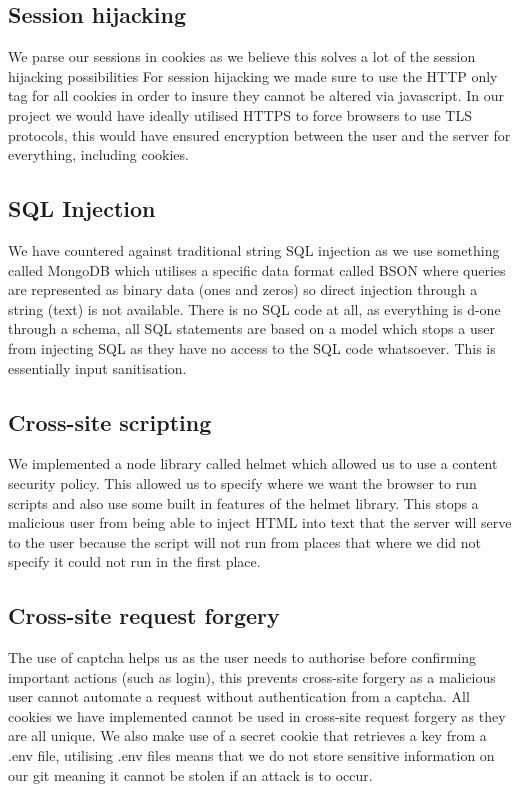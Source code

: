 \documentclass{ueacmpstyle}
\begin{document}
	\subsection{Session hijacking}
	
	We parse our sessions in cookies as we believe this solves a lot of the session hijacking possibilities
	For session hijacking we made sure to use the HTTP only tag for all cookies in order to insure they cannot be altered via javascript. In our project we would have ideally utilised HTTPS to force browsers to use TLS protocols, this would have ensured encryption between the user and the server for everything, including cookies. \cite{sessionhijack}
	
	\subsection{SQL Injection}
	
	We have countered against traditional string SQL injection as we use something called MongoDB which utilises a specific data format called BSON where queries are represented as binary data (ones and zeros) so direct injection through a string (text) is not available. There is no SQL code at all, as everything is d-one through a schema, all SQL statements are based on a model which stops a user from injecting SQL as they have no access to the SQL code whatsoever. This is essentially input sanitisation. \cite{sqlinjection}
	
	\subsection{Cross-site scripting}
	
	We implemented a node library called helmet \cite{helmet} which allowed us to use a content security policy. This allowed us to specify where we want the browser to run scripts and also use some built in features of the helmet library. This stops a malicious user from being able to inject HTML into text that the server will serve to the user because the script will not run from places that where we did not specify it could not run in the first place. \cite{xss}
	
	\subsection{Cross-site request forgery }
	
	The use of captcha helps us as the user needs to authorise before confirming important actions (such as login), this prevents cross-site forgery as a malicious user cannot automate a request without authentication from a captcha. All cookies we have implemented cannot be used in cross-site request forgery as they are all unique. We also make use of a secret cookie that retrieves a key from a .env file, utilising .env files means that we do not store sensitive information on our git meaning it cannot be stolen if an attack is to occur. \cite{csrf}
	
\end{document}
